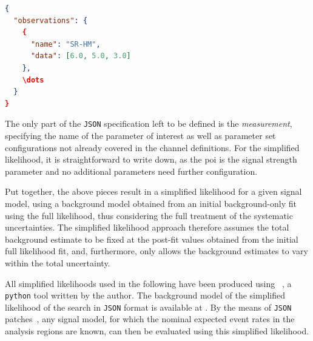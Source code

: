 \begin{minipage}{\linewidth}
\begin{lstlisting}[language=json,firstnumber=1,caption={Example of an observation in the simplified likelihood, taken directly from the full likelihood of the \onelepton search. The number of events observed in data are given for each bin in the exclusion signal region SR-HM. Similar entries exist for all other regions, indicated by the dots `\dots'.},captionpos=b, label=lst:observation]
{
  "observations": {
    {
      "name": "SR-HM", 
      "data": [6.0, 5.0, 3.0]
    },
    \dots
  }	
}
\end{lstlisting}
\end{minipage}

The only part of the \texttt{JSON} specification left to be defined is the \textit{measurement}, specifying the name of the parameter of interest as well as parameter set configurations not already covered in the channel definitions. For the simplified likelihood, it is straightforward to write down, as the \gls{poi} is the signal strength parameter and no additional parameters need further configuration. 


Put together, the above pieces result in a simplified likelihood for a given signal model, using a background model obtained from an initial background-only fit using the full likelihood, thus considering the full treatment of the systematic uncertainties.
The simplified likelihood approach therefore assumes the total background estimate to be fixed at the post-fit values obtained from the initial full likelihood fit, and, furthermore, only allows the background estimates to vary within the total uncertainty.

All simplified likelihoods used in the following have been produced using ~\cite{simplify}, a \texttt{python} tool written by the author.
The background model of the simplified likelihood of the \onelepton search in \texttt{JSON} format is available at \cite{simplified_lh_SUSY-2019-08}.
By the means of \texttt{JSON} patches~\cite{json_patch}, any signal model, for which the nominal expected event rates in the analysis regions are known, can then be evaluated using this simplified likelihood.


